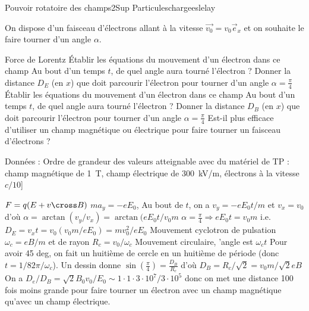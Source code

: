 \begin{exercise}{Pouvoir rotatoire des champs}{2}{Sup}
{Particuleschargees}{lelay}

On dispose d'un faisceau d'électrons allant à la vitesse $\vec{v_0} = v_0 \vec{e}_x$ et on souhaite le faire tourner d'un angle $\alpha$.

\begin{questions}
    \questioncours Force de Lorentz
    \question Établir les équations du mouvement d'un électron dans ce champ
    \question Au bout d'un temps $t$, de quel angle aura tourné l'électron ?
    \question Donner la distance $D_E$ (en $x$) que doit parcourir l'électron pour tourner d'un angle $\alpha = \frac{\pi}{4}$
    \question Établir les équations du mouvement d'un électron dans ce champ
    \question Au bout d'un temps $t$, de quel angle aura tourné l'électron ?
    \question Donner la distance $D_B$ (en $x$) que doit parcourir l'électron pour tourner d'un angle $\alpha = \frac{\pi}{4}$
    \question Est-il plus efficace d'utiliser un champ magnétique ou électrique pour faire tourner un faisceau d'électrons ?
    
\end{questions}
Données : Ordre de grandeur des valeurs atteignable avec du matériel de TP : champ magnétique de 1~T, champ électrique de 300~kV/m, électrons à la vitesse $c/10$]

\end{exercise}

\begin{solution}

\begin{questions}
    \questioncours $F = q(E + v \cross B)$
    \question $m a_y = -e E_0$, 
    \question Au bout de $t$, on a $v_y = -e E_0 t/m$ et $v_x = v_0$ d'où $\alpha = \arctan(v_y/v_x) = \arctan(e E_0 t / v_0m$
    \question $\alpha = \frac{\pi}{4} \Rightarrow e E_0 t = v_0 m$ i.e. $D_E = v_x t = v_0 (v_0 m / e E_0) = m v_0^2 /e E_0$
    \question Mouvement cyclotron de pulsation $\omega_c = eB/m$ et de rayon $R_c = v_0/\omega_c$
    \question Mouvement circulaire, 'angle est $\omega_c t$
    \question Pour avoir 45 deg, on fait un huitième de cercle en un huitième de période (donc $t = 1/8 2\pi/\omega_c$). Un dessin donne $\sin(\frac{\pi}{4}) = \frac{D_B}{R_c}$ d'où $D_B = R_c/\sqrt{2} = v_0 m/\sqrt{2} eB$
    \question On a $D_e/D_B =\sqrt{2} B_0 v_0/E_0 \sim 1 \cdot 1 \cdot 3\cdot 10^7/3\cdot 10^5$ donc on met une distance 100 fois moins grande pour faire tourner un électron avec un champ magnétique qu'avec un champ électrique.
    
\end{questions}

\end{solution}